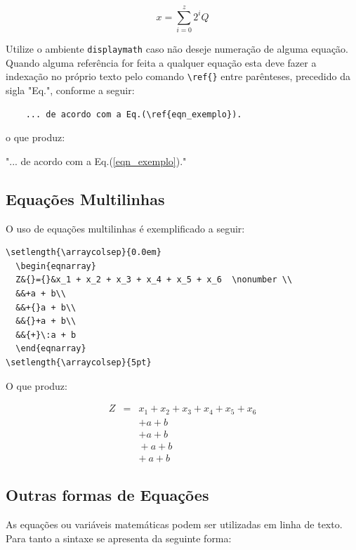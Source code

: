 \documentclass[12pt,A4,A4pt]{article}
\begin{document}
\begin{equation}
     \label{eqn_exemplo}
      x = \sum\limits_{i=0}^{z} 2^{i}Q
\end{equation}

Utilize o ambiente \verb|displaymath| caso não deseje numeração de alguma equação. Quando alguma referência for feita a qualquer equação esta deve fazer a indexação no próprio texto pelo comando \verb|\ref{}| entre parênteses, precedido da sigla "Eq.", conforme a seguir:

\begin{verbatim}
    ... de acordo com a Eq.(\ref{eqn_exemplo}).
\end{verbatim}
o que produz:

"... de acordo com a Eq.(\ref{eqn_exemplo})."


\subsection{Equações Multilinhas}

O uso de equações multilinhas é exemplificado a seguir:

\begin{verbatim}
\setlength{\arraycolsep}{0.0em}
  \begin{eqnarray}
  Z&{}={}&x_1 + x_2 + x_3 + x_4 + x_5 + x_6  \nonumber \\
  &&+a + b\\
  &&+{}a + b\\
  &&{}+a + b\\
  &&{+}\:a + b
  \end{eqnarray}
\setlength{\arraycolsep}{5pt}
\end{verbatim}

O que produz:

\setlength{\arraycolsep}{0.0em}
\begin{eqnarray}
Z&{}={}&x_1 + x_2 + x_3 + x_4 + x_5 + x_6  \nonumber \\
&&+a + b\\
&&+{}a + b\\
&&{}+a + b\\
&&{+}\:a + b
\end{eqnarray}
\setlength{\arraycolsep}{5pt}

\subsection{Outras formas de Equações}

As equações ou variáveis matemáticas podem ser utilizadas em linha de texto. Para tanto a sintaxe se apresenta da seguinte forma:
\end{document}
